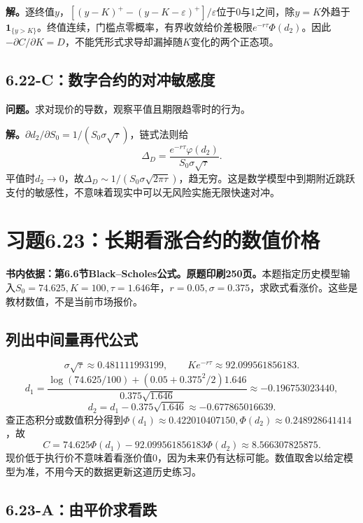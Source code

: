 \documentclass[11pt,a4paper,UTF8,fontset=fandol]{ctexart}
\begin{document}
\textbf{解。}逐终值\(y\)，\([(y-K)^+-(y-K-\varepsilon)^+]/\varepsilon\)位于0与1之间，除\(y=K\)外趋于\(\mathbf1_{\{y>K\}}\)。终值连续，门槛点零概率，有界收敛给价差极限\(e^{-r\tau}\Phi(d_2)\)。因此\(-\partial C/\partial K=D\)，不能凭形式求导却漏掉随\(K\)变化的两个正态项。

\subsection{6.22-C：数字合约的对冲敏感度}\label{cux6570ux5b57ux5408ux7ea6ux7684ux5bf9ux51b2ux654fux611fux5ea6}

\textbf{问题。}求对现价的导数，观察平值且期限趋零时的行为。

\textbf{解。}\(\partial d_2/\partial S_0=1/(S_0\sigma\sqrt\tau)\)，链式法则给
\[\boxed{\Delta_D=\frac{e^{-r\tau}\varphi(d_2)}{S_0\sigma\sqrt\tau}.}\]
平值时\(d_2\to0\)，故\(\Delta_D\sim1/(S_0\sigma\sqrt{2\pi\tau})\)，趋无穷。这是数学模型中到期附近跳跃支付的敏感性，不意味着现实中可以无风险实施无限快速对冲。

\bigskip

\section{习题6.23：长期看涨合约的数值价格}\label{ux4e60ux98986.23ux957fux671fux770bux6da8ux5408ux7ea6ux7684ux6570ux503cux4ef7ux683c}

\textbf{书内依据：第6.6节Black--Scholes公式。原题印刷250页。}本题指定历史模型输入\(S_0=74.625,K=100,\tau=1.646\)年，\(r=0.05,\sigma=0.375\)，求欧式看涨价。这些是教材数值，不是当前市场报价。

\subsection{列出中间量再代公式}\label{ux5217ux51faux4e2dux95f4ux91cfux518dux4ee3ux516cux5f0f}

\[\sigma\sqrt\tau\approx0.481111993199,\qquad
Ke^{-r\tau}\approx92.099561856183.\]
\[d_1=\frac{\log(74.625/100)+(0.05+0.375^2/2)1.646}{0.375\sqrt{1.646}}
\approx-0.196753023440,\]
\[d_2=d_1-0.375\sqrt{1.646}\approx-0.677865016639.\]
查正态积分或数值积分得到\(\Phi(d_1)\approx0.422010407150,\Phi(d_2)\approx0.248928641414\)，故
\[\boxed{C=74.625\Phi(d_1)-92.099561856183\Phi(d_2)
\approx8.566307825875.}\]
现价低于执行价不意味着看涨价值0，因为未来仍有达标可能。数值取舍以给定模型为准，不用今天的数据更新这道历史练习。

\subsection{6.23-A：由平价求看跌}\label{aux7531ux5e73ux4ef7ux6c42ux770bux8dcc}
\end{document}
